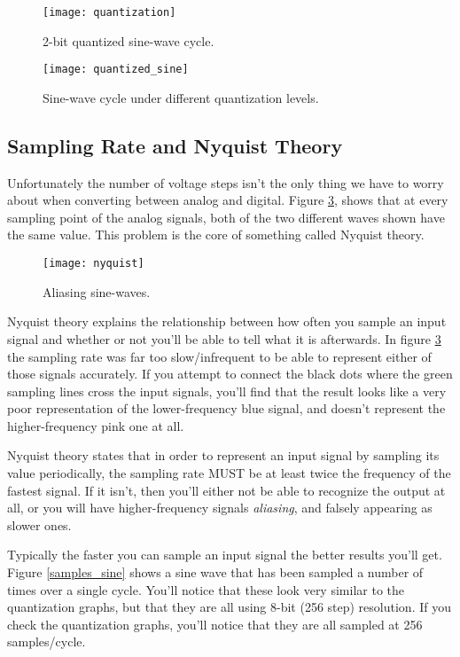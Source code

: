 \documentclass[11pt,fleqn]{book} %
\begin{document}
\begin{figure}[]
    \centering\texttt{[image: quantization]}
    \caption{2-bit quantized sine-wave cycle.}
    \label{quantization}
\end{figure}

\begin{figure}[]
    \centering\texttt{[image: quantized\_sine]}
    \caption{Sine-wave cycle under different quantization levels.}
    \label{quantized_sine}
\end{figure}

\subsection{Sampling Rate and Nyquist Theory}
Unfortunately the number of voltage steps isn't the only thing we have to worry about when converting between analog and digital. Figure \ref{nyquist}, shows that at every sampling point of the analog signals, both of the two different waves shown have the same value. This problem is the core of something called Nyquist theory.

\begin{figure}[]
    \centering\texttt{[image: nyquist]}
    \caption{Aliasing sine-waves.}
    \label{nyquist}
\end{figure}

Nyquist theory explains the relationship between how often you sample an input signal and whether or not you'll be able to tell what it is afterwards. In figure \ref{nyquist} the sampling rate was far too slow/infrequent to be able to represent either of those signals accurately. If you attempt to connect the black dots where the green sampling lines cross the input signals, you'll find that the result looks like a very poor representation of the lower-frequency blue signal, and doesn't represent the higher-frequency pink one at all. 

Nyquist theory states that in order to represent an input signal by sampling its value periodically, the sampling rate MUST be at least twice the frequency of the fastest signal. If it isn't, then you'll either not be able to recognize the output at all, or you will have higher-frequency signals \textit{aliasing}, and falsely appearing as slower ones.

Typically the faster you can sample an input signal the better results you'll get. Figure \ref{samples_sine} shows a sine wave that has been sampled a number of times over a single cycle. You'll notice that these look very similar to the quantization graphs, but that they are all using 8-bit (256 step) resolution. If you check the quantization graphs, you'll notice that they are all sampled at 256 samples/cycle. 
\end{document}
